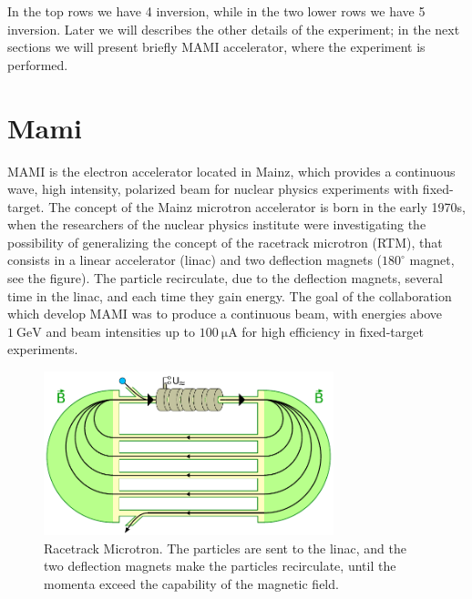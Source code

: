 In the top rows we have 4 inversion, while in the two lower rows we have 5 inversion. \smallskip
Later we will describes the other details of the experiment; in the next sections we will present briefly MAMI accelerator, where the experiment is performed. 

\section{Mami}

MAMI is the electron accelerator located in Mainz, which provides a continuous wave, high intensity, polarized beam for nuclear physics experiments with fixed-target. The concept of the Mainz microtron accelerator is born in the early 1970s, when the researchers of the nuclear physics institute were investigating the possibility of generalizing the concept of the racetrack microtron (RTM), that consists in a linear accelerator (linac) and two deflection magnets ($180^{\circ}$ magnet, see the figure). The particle recirculate, due to the deflection magnets, several time in the linac, and each time they gain energy.  The goal of the collaboration which develop MAMI was to produce a continuous beam, with energies above $\SI{1}{\giga \electronvolt}$ and beam intensities up to $\SI{100}{\micro \ampere}$ for high efficiency in fixed-target experiments.

\begin{figure}[hbtp]

\centering
\includegraphics[width = 0.75\textwidth]{ExperimentalSetup/RacetrackMicrotronSketch.pdf}
\caption{Racetrack Microtron. The particles are sent to the linac, and the two deflection magnets make the particles recirculate, until the momenta exceed the capability of the magnetic field.}
\end{figure}

